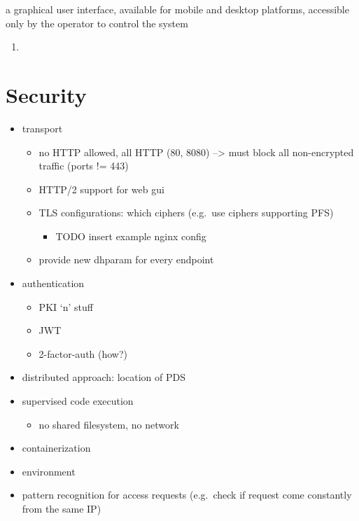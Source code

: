 \documentclass[12pt,english,a4paper,titlepage,cleardoublepage=empty,dottedtoc]{report}
\providecommand{\tightlist}{%
  \setlength{\itemsep}{0pt}\setlength{\parskip}{0pt}}
\begin{document}
a graphical user interface, available for mobile and desktop platforms,
accessible only by the operator to control the system

\begin{enumerate}
\def\labelenumi{\alph{enumi})}
\item
\end{enumerate}

\section{Security}\label{security}

\begin{itemize}
\tightlist
\item
  transport

  \begin{itemize}
  \tightlist
  \item
    no HTTP allowed, all HTTP (80, 8080) --\textgreater{} must block all
    non-encrypted traffic (ports != 443)
  \item
    HTTP/2 support for web gui
  \item
    TLS configurations: which ciphers (e.g.~use ciphers supporting PFS)

    \begin{itemize}
    \tightlist
    \item
      TODO insert example nginx config
    \end{itemize}
  \item
    provide new dhparam for every endpoint
  \end{itemize}
\item
  authentication

  \begin{itemize}
  \tightlist
  \item
    PKI `n' stuff
  \item
    JWT
  \item
    2-factor-auth (how?)
  \end{itemize}
\item
  distributed approach: location of PDS
\item
  supervised code execution

  \begin{itemize}
  \tightlist
  \item
    no shared filesystem, no network
  \end{itemize}
\item
  containerization
\item
  environment
\item
  pattern recognition for access requests (e.g.~check if request come
  constantly from the same IP)


\end{itemize}
\end{document}
